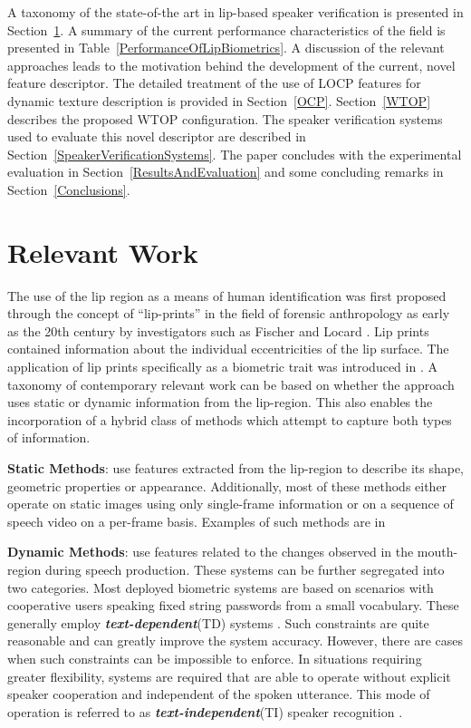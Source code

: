 \documentclass[a4paper, 10pt, conference]{ieeeconf}      %
\begin{document}
A taxonomy of the state-of-the art in lip-based speaker verification is presented in Section~\ref{RelevantWork}. A summary of the current performance characteristics of the field is presented in Table~\ref{PerformanceOfLipBiometrics}. A discussion of the relevant approaches leads to the motivation behind the development of the current, novel feature descriptor. The detailed treatment of the use of LOCP features for dynamic texture description is provided in Section~\ref{OCP}. Section~\ref{WTOP} describes the proposed WTOP configuration. The speaker verification systems used to evaluate this novel descriptor are described in Section~\ref{SpeakerVerificationSystems}. The paper concludes with the experimental evaluation in Section~\ref{ResultsAndEvaluation} and some concluding remarks in Section~\ref{Conclusions}.

\section{Relevant Work}
\label{RelevantWork}

The use of the lip region as a means of human identification was first proposed through the concept of ``lip-prints'' in the field of forensic anthropology as early as the 20th century by investigators such as Fischer and Locard \cite{Kasprzak90Poss}. 
Lip prints contained information about the individual eccentricities of the lip surface. 
The application of lip prints specifically as a biometric trait was introduced in \cite{Suzuki68Trail}. 
A taxonomy of contemporary relevant work can be based on whether the approach uses static or dynamic information from the lip-region. 
This also enables the incorporation of a hybrid class of methods which attempt to capture both types of information. 

\noindent\textbf{Static Methods}: use features extracted from the lip-region to describe its shape, geometric properties or appearance. Additionally, most of these methods either operate on static images using only single-frame information or on a sequence of speech video on a per-frame basis. Examples of such methods are in  \cite{Chibelushi96Design,Jourlin97Acoustic,Cetingul04Use,Gomez02Biometric,Broun02Automatic,Choras08Human}

\noindent\textbf{Dynamic Methods}: use features related to the changes observed in the mouth-region during speech production. 
These systems can be further segregated into two categories. 
Most deployed biometric systems are based on scenarios with cooperative users speaking fixed string passwords from a small vocabulary. 
These generally employ \textbf{\emph{text-dependent}}(TD) systems \cite{Ramos06Fusion}. 
Such constraints are quite reasonable and can greatly improve the system accuracy. 
However, there are cases when such constraints can be impossible to enforce. 
In situations requiring greater flexibility, systems are required that are able to operate without explicit speaker cooperation and independent of the spoken utterance. 
This mode of operation is referred to as \textbf{\emph{text-independent}}(TI) speaker recognition \cite{Faraj06Person,Faraj06Motion,Samad07Lower}.
\end{document}
